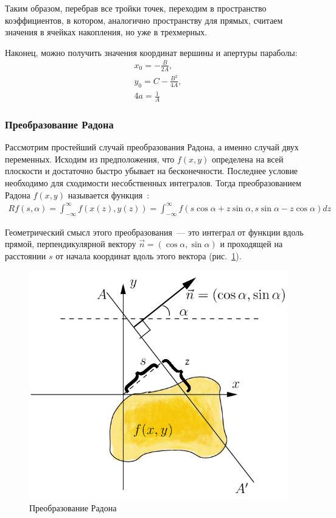 \documentclass[12pt,a4paper]{article} %
\begin{document}
Таким образом, перебрав все тройки точек, переходим в пространство коэффициентов, в котором, аналогично пространству для прямых, считаем значения в ячейках накопления, но уже в трехмерных.

Наконец, можно получить значения координат вершины и апертуры параболы:
\begin{gather}\label{parab_equ_4}
	x_0 = -\frac{B}{2A},\\
	y_0 = C-\frac{B^2}{4A},\\
	4a=\frac{1}{A}
\end{gather}


\subsubsection{Преобразование Радона}

Рассмотрим простейший случай преобразования Радона, а именно случай двух переменных. Исходим из предположения, что $f(x,y)$ определена на всей плоскости и достаточно быстро убывает на бесконечности. Последнее условие необходимо для сходимости несобственных интегралов. Тогда преобразованием Радона $f(x,y)$ называется функция~\cite{Radon}:
\begin{gather}\label{radon}
	Rf(s, \alpha) = \int_{-\infty}^{\infty}{f(x(z),y(z))} = \int_{-\infty}^{\infty}{f(s\cos{\alpha}+z\sin{\alpha}, s\sin{\alpha}-z\cos{\alpha})dz}
\end{gather}

Геометрический смысл этого преобразования~--- это интеграл от функции вдоль прямой, перпендикулярной вектору $\vec{n}=(\cos{\alpha}, \sin{\alpha})$ и проходящей на расстоянии $s$ от начала координат вдоль этого вектора (рис.~\ref{fig:Radon_transform}).
\begin{figure}[h]
	
	\centering
	
	\includegraphics[width=0.5\linewidth]{Radon_transform.jpg}
	
	\caption{Преобразование Радона}
	
	\label{fig:Radon_transform}
	
\end{figure}
\end{document}
